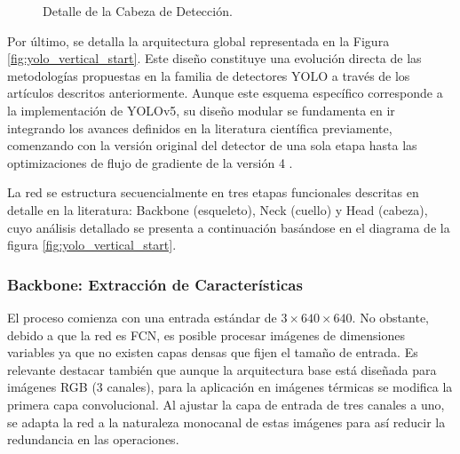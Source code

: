 \documentclass{article}
\begin{document}
\begin{figure}[H]
{
		}
		\caption{Detalle de la Cabeza de Detección.}
		\label{fig:yolo_head_detail}
	\end{figure}
	

	
	Por último, se detalla la arquitectura global representada en la Figura \ref{fig:yolo_vertical_start}. Este diseño constituye una evolución directa de las metodologías propuestas en la familia de detectores YOLO a través de los artículos descritos anteriormente. Aunque este esquema específico corresponde a la implementación de YOLOv5, su diseño modular se fundamenta en ir integrando los avances definidos en la literatura científica previamente, comenzando con la versión original del detector de una sola etapa \cite{redmon2016lookonceunifiedrealtime} hasta las optimizaciones de flujo de gradiente de la versión 4 \cite{bochkovskiy2020yolov4optimalspeedaccuracy}.
	
	
	La red se estructura secuencialmente en tres etapas funcionales descritas en detalle en la literatura: Backbone (esqueleto), Neck (cuello) y Head (cabeza), cuyo análisis detallado se presenta a continuación basándose en el diagrama de la figura \ref{fig:yolo_vertical_start}.
	
	
	\subsubsection{Backbone: Extracción de Características}
	El proceso comienza con una entrada estándar de $3 \times 640 \times 640$. No obstante, debido a que la red es FCN, es posible procesar imágenes de dimensiones variables ya que no existen capas densas que fijen el tamaño de entrada. Es relevante destacar también que aunque la arquitectura base está diseñada para imágenes RGB (3 canales), para la aplicación en imágenes térmicas se modifica la primera capa convolucional. Al ajustar la capa de entrada de tres canales a uno, se adapta la red a la naturaleza monocanal de estas imágenes para así reducir la redundancia en las operaciones.
		
\end{document}
